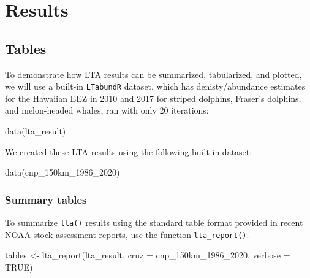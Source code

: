 \documentclass[
]{book}
\newenvironment{Shaded}{\begin{snugshade}}{\end{snugshade}}
\newcommand{\AttributeTok}[1]{\textcolor[rgb]{0.77,0.63,0.00}{#1}}
\newcommand{\ConstantTok}[1]{\textcolor[rgb]{0.00,0.00,0.00}{#1}}
\newcommand{\FunctionTok}[1]{\textcolor[rgb]{0.00,0.00,0.00}{#1}}
\newcommand{\NormalTok}[1]{#1}
\newcommand{\OtherTok}[1]{\textcolor[rgb]{0.56,0.35,0.01}{#1}}
\begin{document}
\hypertarget{part-results}{%
\part{Results}\label{part-results}}

\hypertarget{tables}{%
\chapter{Tables}\label{tables}}

To demonstrate how LTA results can be summarized, tabularized, and plotted, we will use a built-in \texttt{LTabundR} dataset, which has denisty/abundance estimates for the Hawaiian EEZ in 2010 and 2017 for striped dolphins, Fraser's dolphins, and melon-headed whales, ran with only 20 iterations:

\begin{Shaded}
\begin{Highlighting}[]
\FunctionTok{data}\NormalTok{(lta\_result)}
\end{Highlighting}
\end{Shaded}

We created these LTA results using the following built-in dataset:

\begin{Shaded}
\begin{Highlighting}[]
\FunctionTok{data}\NormalTok{(cnp\_150km\_1986\_2020)}
\end{Highlighting}
\end{Shaded}

\hypertarget{summary-tables}{%
\section*{Summary tables}\label{summary-tables}}

To summarize \texttt{lta()} results using the standard table format provided in recent NOAA stock assessment reports, use the function \texttt{lta\_report()}.

\begin{Shaded}
\begin{Highlighting}[]
\NormalTok{tables }\OtherTok{\textless{}{-}} \FunctionTok{lta\_report}\NormalTok{(lta\_result, }
                     \AttributeTok{cruz =}\NormalTok{ cnp\_150km\_1986\_2020,}
                     \AttributeTok{verbose =} \ConstantTok{TRUE}\NormalTok{)}
\end{Highlighting}
\end{Shaded}
\end{document}
